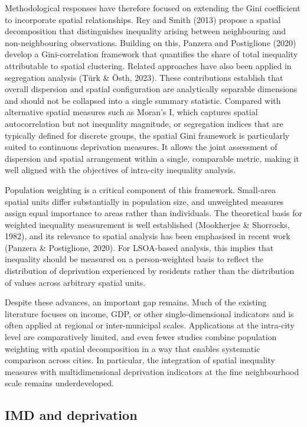 Methodological responses have therefore focused on extending the Gini coefficient to incorporate spatial relationships. Rey and Smith (2013) propose a spatial decomposition that distinguishes inequality arising between neighbouring and non-neighbouring observations. Building on this, Panzera and Postiglione (2020) develop a Gini-correlation framework that quantifies the share of total inequality attributable to spatial clustering. Related approaches have also been applied in segregation analysis (T{\"u}rk \& {\"O}sth, 2023). These contributions establish that overall dispersion and spatial configuration are analytically separable dimensions and should not be collapsed into a single summary statistic. Compared with alternative spatial measures such as Moran's I, which captures spatial autocorrelation but not inequality magnitude, or segregation indices that are typically defined for discrete groups, the spatial Gini framework is particularly suited to continuous deprivation measures. It allows the joint assessment of dispersion and spatial arrangement within a single, comparable metric, making it well aligned with the objectives of intra-city inequality analysis.

Population weighting is a critical component of this framework. Small-area spatial units differ substantially in population size, and unweighted measures assign equal importance to areas rather than individuals. The theoretical basis for weighted inequality measurement is well established (Mookherjee \& Shorrocks, 1982), and its relevance to spatial analysis has been emphasised in recent work (Panzera \& Postiglione, 2020). For LSOA-based analysis, this implies that inequality should be measured on a person-weighted basis to reflect the distribution of deprivation experienced by residents rather than the distribution of values across arbitrary spatial units.

Despite these advances, an important gap remains. Much of the existing literature focuses on income, GDP, or other single-dimensional indicators and is often applied at regional or inter-municipal scales. Applications at the intra-city level are comparatively limited, and even fewer studies combine population weighting with spatial decomposition in a way that enables systematic comparison across cities. In particular, the integration of spatial inequality measures with multidimensional deprivation indicators at the fine neighbourhood scale remains underdeveloped.

\subsection{IMD and deprivation}

